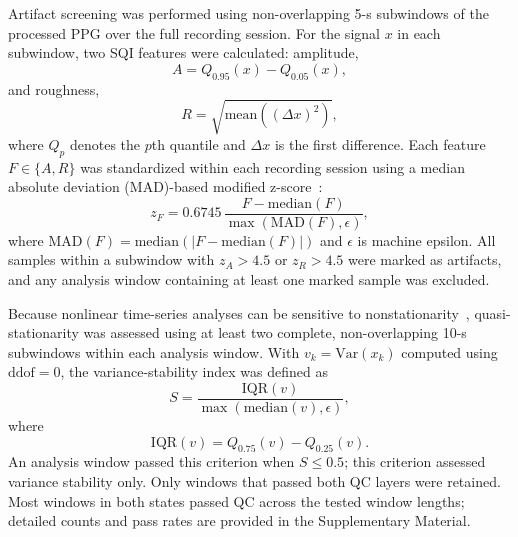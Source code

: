 Artifact screening was performed using non-overlapping 5-s subwindows of the processed PPG over the full recording session. For the signal $x$ in each subwindow, two SQI features were calculated: amplitude,
\[
A=Q_{0.95}(x)-Q_{0.05}(x),
\]
and roughness,
\[
R=\sqrt{\mathrm{mean}((\Delta x)^2)},
\]
where $Q_p$ denotes the $p$th quantile and $\Delta x$ is the first difference. Each feature $F\in\{A,R\}$ was standardized within each recording session using a median absolute deviation (MAD)-based modified z-score~\cite{iglewicz1993}:
\[
z_F=0.6745\,\frac{F-\mathrm{median}(F)}{\max(\mathrm{MAD}(F),\epsilon)},
\]
where $\mathrm{MAD}(F)=\mathrm{median}(|F-\mathrm{median}(F)|)$ and $\epsilon$ is machine epsilon. All samples within a subwindow with $z_A>4.5$ or $z_R>4.5$ were marked as artifacts, and any analysis window containing at least one marked sample was excluded.

Because nonlinear time-series analyses can be sensitive to nonstationarity~\cite{witt1998}, quasi-stationarity was assessed using at least two complete, non-overlapping 10-s subwindows within each analysis window. With $v_k=\mathrm{Var}(x_k)$ computed using $\mathrm{ddof}=0$, the variance-stability index was defined as
\[
S=\frac{\mathrm{IQR}(v)}{\max(\mathrm{median}(v),\epsilon)},
\]
where
\[
\mathrm{IQR}(v)=Q_{0.75}(v)-Q_{0.25}(v).
\]
An analysis window passed this criterion when $S\leq0.5$; this criterion assessed variance stability only. Only windows that passed both QC layers were retained. Most windows in both states passed QC across the tested window lengths; detailed counts and pass rates are provided in the Supplementary Material.